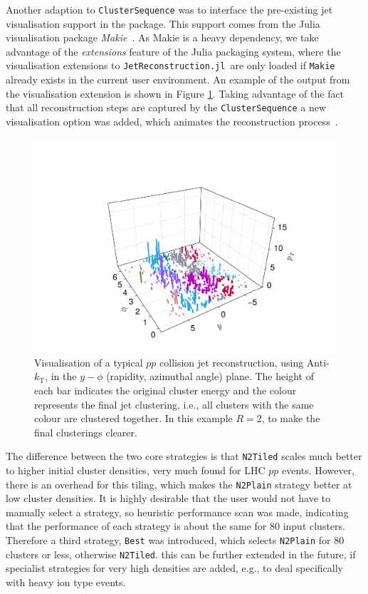 \documentclass{webofc}
\newcommand{\Akt}{Anti-${k}_\text{T}$}
\newcommand{\JR}{\texttt{JetReconstruction.jl}}
\begin{document}
Another adaption to \texttt{ClusterSequence} was to interface the pre-existing
jet visualisation support in the package. This support comes from the Julia
visualisation package \emph{Makie}~\cite{Danisch2021}. As Makie is a heavy
dependency, we take advantage of the \emph{extensions} feature of the Julia
packaging system, where the visualisation extensions to \JR\ are only loaded if
\texttt{Makie} already exists in the current user environment. An example of the
output from the visualisation extension is shown in Figure \ref{fig:jetvisplot}.
Taking advantage of the fact that all reconstruction steps are captured by the
\texttt{ClusterSequence} a new visualisation option was added, which animates
the reconstruction process~\cite{jetrecoAnimationCHEP2024}.

\begin{figure}[h]
    \begin{center}
        \includegraphics[width=0.6\linewidth]{jetvis-5-compact.pdf}
        \caption{Visualisation of a typical $pp$ collision jet reconstruction, using \Akt, in the $y-\phi$ (rapidity, azimuthal angle) plane. The height of each bar indicates the original cluster energy and the colour represents the final jet clustering, i.e., all clusters with the same colour are clustered together. In this example $R=2$, to make the final clusterings clearer.}
        \label{fig:jetvisplot}
    \end{center}
\end{figure}

The difference between the two core strategies is that \texttt{N2Tiled} scales
much better to higher initial cluster densities, very much found for LHC $pp$
events. However, there is an overhead for this tiling, which makes the
\texttt{N2Plain} strategy better at low cluster densities. It is highly
desirable that the user would not have to manually select a strategy, so
heuristic performance scan was made, indicating that the performance of each
strategy is about the same for 80 input clusters. Therefore a third strategy,
\texttt{Best} was introduced, which selects \texttt{N2Plain} for 80 clusters or
less, otherwise \texttt{N2Tiled}. this can be further extended in the future, if
specialist strategies for very high densities are added, e.g., to deal
specifically with heavy ion type events.
\end{document}

